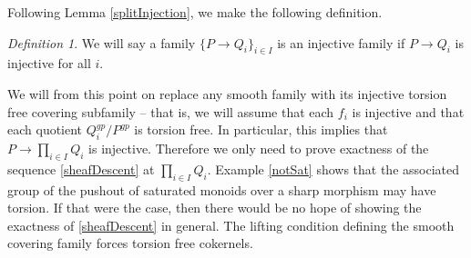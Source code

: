 \documentclass[12pt]{amsart}
\numberwithin{equation}{section}
\theoremstyle{plain}
\theoremstyle{remark}
\newtheorem{defn}[equation]{Definition}
\begin{document}
Following Lemma \eqref{splitInjection}, we make the following definition.
\begin{defn}\label{injectiveFamily}
	We will say a family $\{P\to Q_i\}_{i\in I}$ is an injective family if $P\to Q_i$ is injective for all $i$.
\end{defn}
We will from this point on replace any smooth family with its injective torsion free covering subfamily -- that is, we will assume that each $f_i$ is injective and that each quotient $Q_i^{gp}/P^{gp}$ is torsion free. In particular, this implies that $P\to \prod_{i\in I}Q_i$ is injective. Therefore we only need to prove exactness of the sequence \eqref{sheafDescent} at $\prod_{i\in I}Q_i$. Example \eqref{notSat} shows that the associated group of the pushout of saturated monoids over a sharp morphism may have torsion. If that were the case, then there would be no hope of showing the exactness of \eqref{sheafDescent} in general. The lifting condition defining the smooth covering family forces torsion free cokernels.
\end{document}
